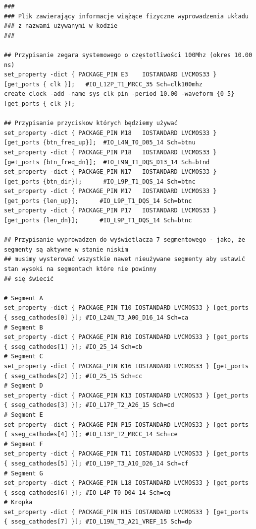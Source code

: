 \documentclass[a4paper]{article}
\begin{document}
\begin{verbatim}
###
### Plik zawierający informacje wiążące fizyczne wyprowadzenia układu
### z nazwami używanymi w kodzie
###

## Przypisanie zegara systemowego o częstotliwości 100Mhz (okres 10.00 ns)
set_property -dict { PACKAGE_PIN E3    IOSTANDARD LVCMOS33 } [get_ports { clk }];   #IO_L12P_T1_MRCC_35 Sch=clk100mhz
create_clock -add -name sys_clk_pin -period 10.00 -waveform {0 5} [get_ports { clk }];

## Przypisanie przyciskow których będziemy używać 
set_property -dict { PACKAGE_PIN M18   IOSTANDARD LVCMOS33 } [get_ports {btn_freq_up}];  #IO_L4N_T0_D05_14 Sch=btnu
set_property -dict { PACKAGE_PIN P18   IOSTANDARD LVCMOS33 } [get_ports {btn_freq_dn}];  #IO_L9N_T1_DQS_D13_14 Sch=btnd
set_property -dict { PACKAGE_PIN N17   IOSTANDARD LVCMOS33 } [get_ports {btn_dir}];      #IO_L9P_T1_DQS_14 Sch=btnc
set_property -dict { PACKAGE_PIN M17   IOSTANDARD LVCMOS33 } [get_ports {len_up}];      #IO_L9P_T1_DQS_14 Sch=btnc
set_property -dict { PACKAGE_PIN P17   IOSTANDARD LVCMOS33 } [get_ports {len_dn}];      #IO_L9P_T1_DQS_14 Sch=btnc

## Przypisanie wyprowadzen do wyświetlacza 7 segmentowego - jako, że segmenty są aktywne w stanie niskim
## musimy wysterować wszystkie nawet nieużywane segmenty aby ustawić stan wysoki na segmentach które nie powinny
## się świecić

# Segment A
set_property -dict { PACKAGE_PIN T10 IOSTANDARD LVCMOS33 } [get_ports { sseg_cathodes[0] }]; #IO_L24N_T3_A00_D16_14 Sch=ca
# Segment B
set_property -dict { PACKAGE_PIN R10 IOSTANDARD LVCMOS33 } [get_ports { sseg_cathodes[1] }]; #IO_25_14 Sch=cb
# Segment C
set_property -dict { PACKAGE_PIN K16 IOSTANDARD LVCMOS33 } [get_ports { sseg_cathodes[2] }]; #IO_25_15 Sch=cc
# Segment D
set_property -dict { PACKAGE_PIN K13 IOSTANDARD LVCMOS33 } [get_ports { sseg_cathodes[3] }]; #IO_L17P_T2_A26_15 Sch=cd
# Segment E
set_property -dict { PACKAGE_PIN P15 IOSTANDARD LVCMOS33 } [get_ports { sseg_cathodes[4] }]; #IO_L13P_T2_MRCC_14 Sch=ce
# Segment F
set_property -dict { PACKAGE_PIN T11 IOSTANDARD LVCMOS33 } [get_ports { sseg_cathodes[5] }]; #IO_L19P_T3_A10_D26_14 Sch=cf
# Segment G
set_property -dict { PACKAGE_PIN L18 IOSTANDARD LVCMOS33 } [get_ports { sseg_cathodes[6] }]; #IO_L4P_T0_D04_14 Sch=cg
# Kropka
set_property -dict { PACKAGE_PIN H15 IOSTANDARD LVCMOS33 } [get_ports { sseg_cathodes[7] }]; #IO_L19N_T3_A21_VREF_15 Sch=dp


\end{verbatim}
\end{document}
